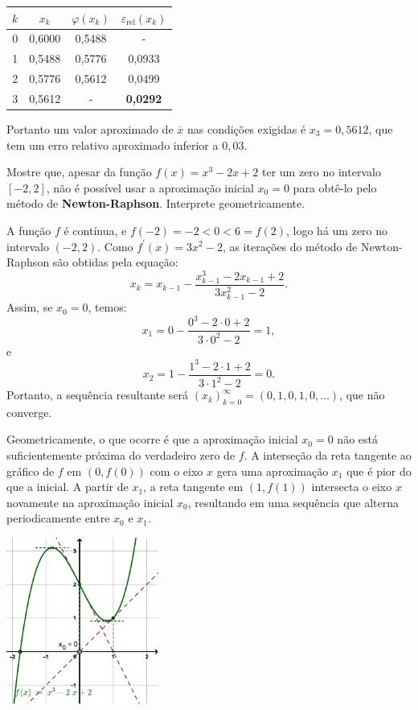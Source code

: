 \documentclass[12pt,a4paper]{article}
\begin{document}
\begin{ExerciseList}
\begin{enumerate}
\begin{center}
\begin{tabular}{cccc}
\hline
$k$ & $x_k$ & $\varphi(x_k)$ & $\varepsilon_{\text{rel}}(x_k)$\\
\hline
0 & 0,6000 & 0,5488 & - \\
1 & 0,5488 & 0,5776 & 0,0933 \\
2 & 0,5776 & 0,5612 & 0,0499 \\
3 & 0,5612 & -      & \textbf{0,0292} \\
\hline
\end{tabular}
\end{center}
Portanto um valor aproximado de $\overline{x}$ nas condições exigidas é $x_3 = 0,5612$, que tem um erro relativo aproximado inferior a $0,03$.
\end{enumerate}\Exercise[title={2,5}] Mostre que, apesar da função \(f(x) = x^3 - 2x + 2\) ter um zero no intervalo \([-2, 2]\), não é possível usar a aproximação inicial \(x_0 = 0\) para obtê-lo pelo método de \textbf{Newton-Raphson}. Interprete geometricamente.

\Answer A função \(f\) é contínua, e \(f(-2) = -2 < 0 < 6 = f(2)\), logo há um zero no intervalo \((-2, 2)\). Como \(f^\prime(x) = 3x^2 - 2\), as iterações do método de Newton-Raphson são obtidas pela equação:
\[
x_k = x_{k-1} - \frac{x_{k-1}^3 - 2x_{k-1} + 2}{3x_{k-1}^2 - 2}.
\]
Assim, se \(x_0 = 0\), temos:
\[
x_1 = 0 - \frac{0^3 - 2 \cdot 0 + 2}{3 \cdot 0^2 - 2} = 1,
\]
e
\[
x_2 = 1 - \frac{1^3 - 2 \cdot 1 + 2}{3 \cdot 1^2 - 2} = 0.
\]
Portanto, a sequência resultante será \((x_k)_{k=0}^\infty = (0, 1, 0, 1, 0, \ldots)\), que não converge.

Geometricamente, o que ocorre é que a aproximação inicial \(x_0 = 0\) não está suficientemente próxima do verdadeiro zero de \(f\). A interseção da reta tangente ao gráfico de \(f\) em \((0, f(0))\) com o eixo \(x\) gera uma aproximação \(x_1\) que é pior do que a inicial. A partir de \(x_1\), a reta tangente em \((1, f(1))\) intersecta o eixo \(x\) novamente na aproximação inicial \(x_0\), resultando em uma sequência que alterna periodicamente entre \(x_0\) e \(x_1\).

\begin{center}
    \includegraphics[width=5cm]{img/newton-raphson.pdf}
\end{center}


\end{ExerciseList}
\end{document}
